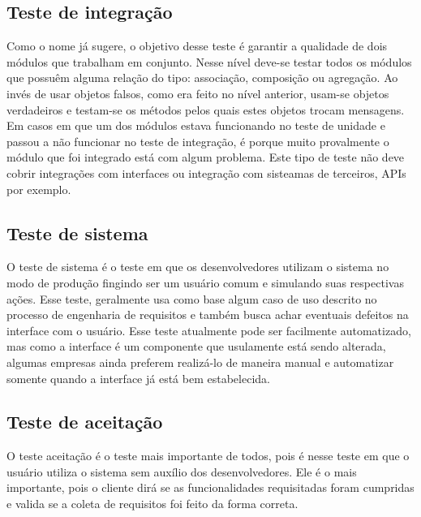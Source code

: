 \documentclass[
    12pt,       %
    openright,      %
    twoside,      %
    a4paper,      %
    english,      %
    french,       %
    spanish,      %
    brazil,       %
    ]{abntex2}
\begin{document}
          \subsection{Teste de integração}
              Como o nome já sugere, o objetivo desse teste é garantir a qualidade de dois módulos
              que trabalham em conjunto. Nesse nível deve-se testar todos os módulos que possuêm
              alguma relação do tipo: associação, composição ou agregação. Ao invés de usar objetos
              falsos, como era feito no nível anterior, usam-se objetos verdadeiros e testam-se os
              métodos pelos quais estes objetos trocam mensagens. Em casos em que um dos módulos
              estava funcionando no teste de unidade e passou a não funcionar no teste de integração,
              é porque muito provalmente o módulo que foi integrado está com algum problema. Este tipo
              de teste não deve cobrir integrações com interfaces ou integração com sisteamas de
              terceiros, APIs por exemplo.

          \subsection{Teste de sistema}
              O teste de sistema é o teste em que os desenvolvedores utilizam o sistema no modo de
              produção fingindo ser um usuário comum e simulando suas respectivas ações. Esse teste,
              geralmente usa como base algum caso de uso descrito no processo de engenharia de
              requisitos e também busca achar eventuais defeitos na interface com o usuário. Esse
              teste atualmente pode ser facilmente automatizado, mas como a interface é um componente
              que usulamente está sendo alterada, algumas empresas ainda preferem realizá-lo de maneira
              manual e automatizar somente quando a interface já está bem estabelecida.

          \subsection{Teste de aceitação}
              O teste aceitação é o teste mais importante de todos, pois é nesse teste em que o
              usuário utiliza o sistema sem auxílio dos desenvolvedores. Ele é o mais importante,
              pois o cliente dirá se as funcionalidades requisitadas foram cumpridas e valida
              se a coleta de requisitos foi feito da forma correta.
\end{document}
